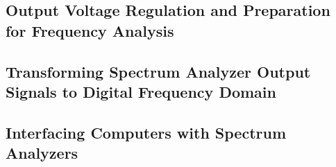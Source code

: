 \documentclass[class=report,11pt,crop=false]{standalone}
\begin{document}
\subsection{Output Voltage Regulation and Preparation for Frequency Analysis}

\subsection{Transforming Spectrum Analyzer Output Signals to Digital Frequency Domain}

\subsection{Interfacing Computers with Spectrum Analyzers}

\ifstandalone

\printnoidxglossary[type=\acronymtype,nonumberlist]
\fi
\end{document}
